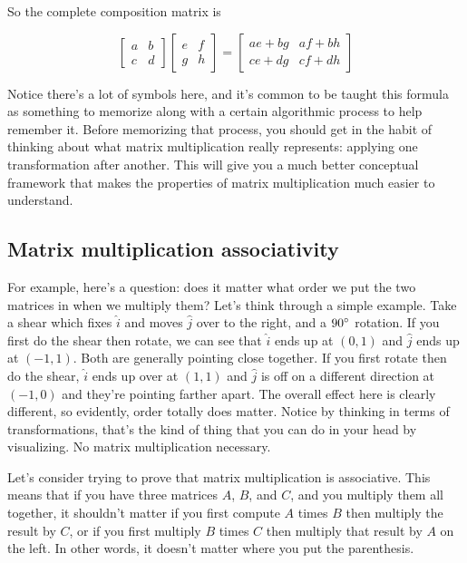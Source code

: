 So the complete composition matrix is

\begin{equation*}
  \begin{bmatrix}
    a & b \\
    c & d
  \end{bmatrix}
  \begin{bmatrix}
    e & f \\
    g & h
  \end{bmatrix} =
  \begin{bmatrix}
    ae + bg & af + bh \\
    ce + dg & cf + dh
  \end{bmatrix}
\end{equation*}

Notice there's a lot of symbols here, and it's common to be taught this formula
as something to memorize along with a certain algorithmic process to help
remember it. Before memorizing that process, you should get in the habit of
thinking about what matrix multiplication really represents: applying one
transformation after another. This will give you a much better conceptual
framework that makes the properties of matrix multiplication much easier to
understand.

\subsection{Matrix multiplication associativity}

For example, here's a question: does it matter what order we put the two
matrices in when we multiply them? Let's think through a simple example. Take a
shear which fixes $\hat{i}$ and moves $\hat{j}$ over to the right, and a
$90\degree$ rotation. If you first do the shear then rotate, we can see that
$\hat{i}$ ends up at $(0, 1)$ and $\hat{j}$ ends up at $(-1, 1)$. Both are
generally pointing close together. If you first rotate then do the shear,
$\hat{i}$ ends up over at $(1, 1)$ and $\hat{j}$ is off on a different direction
at $(-1, 0)$ and they're pointing farther apart. The overall effect here is
clearly different, so evidently, order totally does matter. Notice by thinking
in terms of transformations, that's the kind of thing that you can do in your
head by visualizing. No matrix multiplication necessary.

Let's consider trying to prove that matrix multiplication is associative. This
means that if you have three matrices $A$, $B$, and $C$, and you multiply them
all together, it shouldn't matter if you first compute $A$ times $B$ then
multiply the result by $C$, or if you first multiply $B$ times $C$ then multiply
that result by $A$ on the left. In other words, it doesn't matter where you put
the parenthesis.

